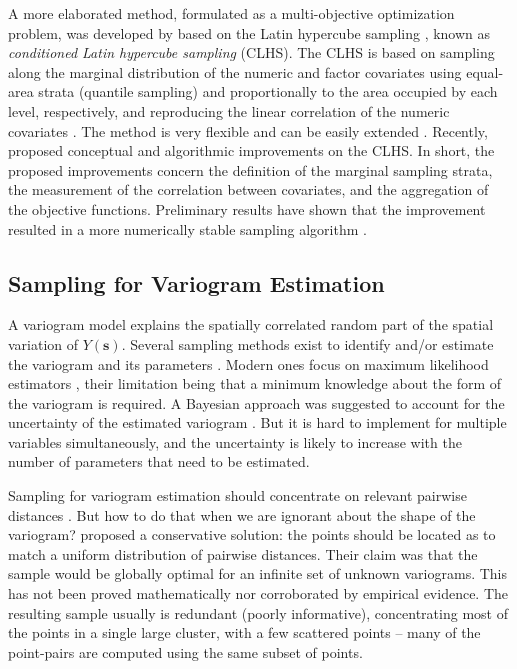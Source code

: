 A more elaborated method, formulated as a multi-objective optimization problem, was developed by 
\citet{MinasnyEtAl2006b} based on the Latin hypercube sampling \cite{McKayEtAl1979}, known as \emph{conditioned 
Latin hypercube sampling} (CLHS). The CLHS is based on sampling along the marginal distribution of the numeric 
and factor covariates using equal-area strata (quantile sampling) and proportionally to the area occupied by 
each level, respectively, and reproducing the linear correlation of the numeric covariates 
\cite{MinasnyEtAl2006b}. The method is very flexible and can be easily extended \cite{MinasnyEtAl2010a, 
RoudierEtAl2012}. Recently, \citet{Samuel-RosaEtAl2016} proposed conceptual and algorithmic improvements on 
the 
CLHS. In short, the proposed improvements concern the definition of the marginal sampling strata, the 
measurement of the correlation between covariates, and the aggregation of the objective functions. Preliminary 
results have shown that the improvement resulted in a more numerically stable sampling algorithm 
\citet{Samuel-RosaEtAl2016}.

\subsection{Sampling for Variogram Estimation}

A variogram model explains the spatially correlated random part of the spatial variation of 
$Y(\boldsymbol{s})$. Several sampling methods exist to identify and/or estimate the variogram and its 
parameters \cite{BrusEtAl1994, deGruijterEtAl2006, Mueller2007, WebsterEtAl2013}. Modern ones focus on maximum 
likelihood estimators \cite{Lark2002, Zimmerman2006, Mueller2007}, their limitation being that a minimum 
knowledge about the form of the variogram is required. A Bayesian approach was suggested to account for the 
uncertainty of the estimated variogram \cite{DiggleEtAl2006, MarchantEtAl2006, ZhuEtAl2006}. But it is hard to 
implement for multiple variables simultaneously, and the uncertainty is likely to increase with the number of 
parameters that need to be estimated.

Sampling for variogram estimation should concentrate on relevant pairwise distances \cite{MuellerEtAl1999, 
Lark2002}. But how to do that when we are ignorant about the shape of the variogram? \citet{BreslerEtAl1982, 
Russo1984, WarrickEtAl1987} proposed a conservative solution: the points should be located as to match a 
uniform distribution of pairwise distances. Their claim was that the sample would be globally optimal for an 
infinite set of unknown variograms. This has not been proved mathematically nor corroborated by empirical 
evidence. The resulting sample usually is redundant (poorly informative), concentrating most of the points in 
a 
single large cluster, with a few scattered points -- many of the point-pairs are computed using the same 
subset 
of points.

